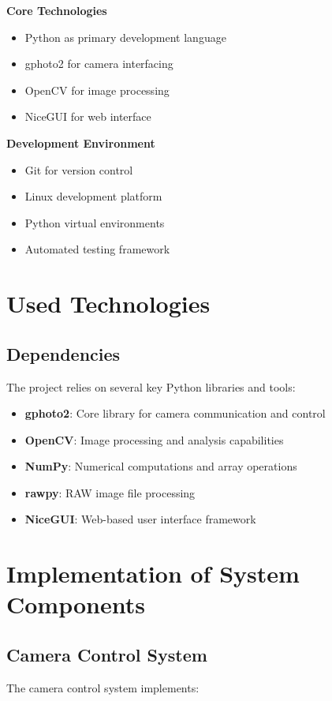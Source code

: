 \textbf{Core Technologies}
\begin{itemize}
    \item Python as primary development language
    \item gphoto2 for camera interfacing
    \item OpenCV for image processing
    \item NiceGUI for web interface
\end{itemize}

\textbf{Development Environment}
\begin{itemize}
    \item Git for version control
    \item Linux development platform
    \item Python virtual environments
    \item Automated testing framework
\end{itemize}

\section{Used Technologies} %

\subsection{Dependencies}
The project relies on several key Python libraries and tools:

\begin{itemize}
    \item \textbf{gphoto2}: Core library for camera communication and control
    \item \textbf{OpenCV}: Image processing and analysis capabilities
    \item \textbf{NumPy}: Numerical computations and array operations
    \item \textbf{rawpy}: RAW image file processing
    \item \textbf{NiceGUI}: Web-based user interface framework
\end{itemize}

\section{Implementation of System Components}

\subsection{Camera Control System}
The camera control system implements:

